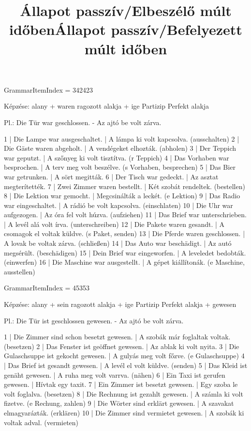 \title{Állapot passzív/Elbeszélő múlt időben}

GrammarItemIndex = 342423

\begin{desc}
Képzése:
alany + waren ragozott alakja + ige Partizip Perfekt alakja

Pl.: Die Tür war geschlossen. - Az ajtó be volt zárva.
\end{desc}

\begin{exmp}
1 | Die Lampe war ausgeschaltet. | A lámpa ki volt kapcsolva. (ausschalten)
2 | Die Gäste waren abgeholt. | A vendégeket elhozták. (abholen)
3 | Der Teppich war geputzt. | A szőnyeg ki volt tisztítva. (r Teppich)
4 | Das Vorhaben war besprochen. | A terv meg volt beszélve. (s Vorhaben, besprechen)
5 | Das Bier war getrunken. | A sört megitták.
6 | Der Tisch war gedeckt. | Az asztat megterítették.
7 | Zwei Zimmer waren bestellt. | Két szobát rendeltek. (bestellen)
8 | Die Lektion war gemocht. | Megcsinálták a leckét. (e Lektion)
9 | Das Radio war eingeschaltet. | A rádió be volt kapcsolva. (einschlaten)
10 | Die Uhr war aufgezogen. | Az óra fel volt húzva. (aufziehen)
11 | Das Brief war unterschrieben. | A levél alá volt írva. (unterschreiben)
12 | Die Pakete waren gesandt. | A csomagok el voltak küldve. (s Paket, senden)
13 | Die Pferde waren geschlossen. | A lovak be voltak zárva. (schließen)
14 | Das Auto war beschädigt. | Az autó megsérült. (beschädigen)
15 | Dein Brief war eingeworfen. | A leveledet bedobták. (einwerfen)
16 | Die Maschine war ausgestellt. | A gépet kiállítonák. (e Maschine, ausstellen)
\end{exmp}

\title{Állapot passzív/Befelyezett múlt időben}

GrammarItemIndex = 45353

\begin{desc}
Képzése:
alany + sein ragozott alakja + ige Partizip Perfekt alakja + gewesen

Pl.: Die Tür ist geschlossen gewesen. - Az ajtó be volt zárva.
\end{desc}

\begin{exmp}
1 | Die Zimmer sind schon besetzt gewesen. | A szobák már foglaltak voltak. (besetzen)
2 | Das Fenster ist geöffnet gewesen. | Az ablak ki volt nyita.
3 | Die Gulaschsuppe ist gekocht gewesen. | A gulyás meg volt főzve. (e Gulaschsuppe)
4 | Das Brief ist gesandt gewesen. | A levél el volt küldve. (senden)
5 | Das Kleid ist genäht gewesen. | A ruha meg volt varrva. (nähen)
6 | Ein Taxi ist gerufen gewesen. | Hívtak egy taxit.
7 | Ein Zimmer ist besetzt gewesen. | Egy szoba le volt foglalva. (besetzen)
8 | Die Rechnung ist gezahlt gewesen. | A számla ki volt fizetve. (e Rechung, zahlen)
9 | Die Wörter sind erklärt gewesen. | A szavakat elmagyarázták. (erklären)
10 | Die Zimmer sind vermietet gewesen. | A szobák ki voltak adval. (vermieten)
\end{exmp}

